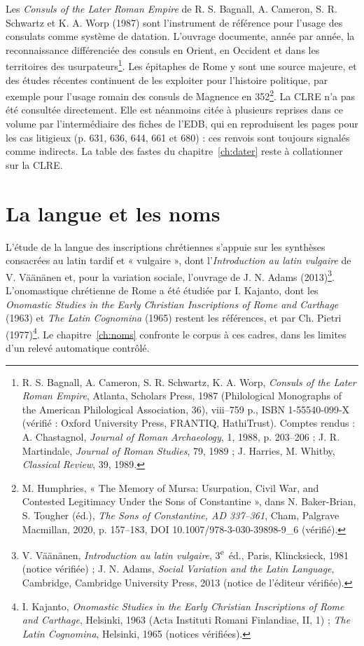 Les \emph{Consuls of the Later Roman Empire} de R. S. Bagnall, A. Cameron, S. R. Schwartz et K. A. Worp (1987) sont l’instrument de référence pour l’usage des consulats comme système de datation. L’ouvrage documente, année par année, la reconnaissance différenciée des consuls en Orient, en Occident et dans les territoires des usurpateurs\footnote{R. S. Bagnall, A. Cameron, S. R. Schwartz, K. A. Worp, \emph{Consuls of the Later Roman Empire}, Atlanta, Scholars Press, 1987 (Philological Monographs of the American Philological Association, 36), viii–759 p., ISBN 1-55540-099-X (vérifié : Oxford University Press, FRANTIQ, HathiTrust). Comptes rendus : A. Chastagnol, \emph{Journal of Roman Archaeology}, 1, 1988, p. 203–206 ; J. R. Martindale, \emph{Journal of Roman Studies}, 79, 1989 ; J. Harries, M. Whitby, \emph{Classical Review}, 39, 1989.}. Les épitaphes de Rome y sont une source majeure, et des études récentes continuent de les exploiter pour l’histoire politique, par exemple pour l’usage romain des consuls de Magnence en 352\footnote{M. Humphries, « The Memory of Mursa: Usurpation, Civil War, and Contested Legitimacy Under the Sons of Constantine », dans N. Baker-Brian, S. Tougher (éd.), \emph{The Sons of Constantine, AD 337–361}, Cham, Palgrave Macmillan, 2020, p. 157–183, DOI 10.1007/978-3-030-39898-9\_6 (vérifié).}. La CLRE n’a pas été consultée directement. Elle est néanmoins citée à plusieurs reprises dans ce volume par l’intermédiaire des fiches de l’EDB, qui en reproduisent les pages pour les cas litigieux (p. 631, 636, 644, 661 et 680) : ces renvois sont toujours signalés comme indirects. La table des fastes du chapitre~\ref{ch:dater} reste à collationner sur la CLRE.

\section{La langue et les noms}

L’étude de la langue des inscriptions chrétiennes s’appuie sur les synthèses consacrées au latin tardif et « vulgaire », dont l’\emph{Introduction au latin vulgaire} de V. Väänänen et, pour la variation sociale, l’ouvrage de J. N. Adams (2013)\footnote{V. Väänänen, \emph{Introduction au latin vulgaire}, 3\textsuperscript{e}~éd., Paris, Klincksieck, 1981 (notice vérifiée) ; J. N. Adams, \emph{Social Variation and the Latin Language}, Cambridge, Cambridge University Press, 2013 (notice de l’éditeur vérifiée).}. L’onomastique chrétienne de Rome a été étudiée par I. Kajanto, dont les \emph{Onomastic Studies in the Early Christian Inscriptions of Rome and Carthage} (1963) et \emph{The Latin Cognomina} (1965) restent les références, et par Ch. Pietri (1977)\footnote{I. Kajanto, \emph{Onomastic Studies in the Early Christian Inscriptions of Rome and Carthage}, Helsinki, 1963 (Acta Instituti Romani Finlandiae, II, 1) ; \emph{The Latin Cognomina}, Helsinki, 1965 (notices vérifiées).}. Le chapitre~\ref{ch:noms} confronte le corpus à ces cadres, dans les limites d’un relevé automatique contrôlé.

